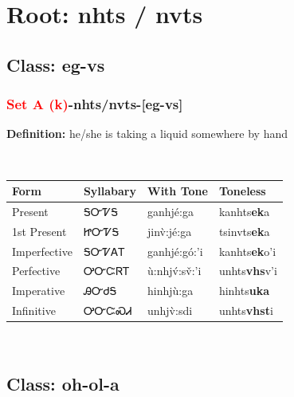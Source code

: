 \needspace{4in}
\section*{Root: nhts / nvts}
\nopagebreak
{}
\needspace{3in}
\subsection*{Class: eg-vs}
\nopagebreak
\needspace{2in}
\subsubsection*{\textcolor{Red}{Set A (k)}{-}\textbf{nhts/nvts}{-}[eg-vs]}
\nopagebreak
\textbf{Definition: } he/she is taking a liquid somewhere by hand
\\[0.5em]
\begin{tabularx}{\textwidth}{l X X X}%
\toprule%
\textbf{Form}&\textbf{Syllabary}&\textbf{With Tone}&\textbf{Toneless}\\%
\midrule%
Present&ᎦᏅᏤᎦ&ganhjé:ga&kanhts\textbf{ek}a\\%
1st Present&ᏥᏅᏤᎦ&jinv̀:jé:ga&tsinvts\textbf{ek}a\\%
Imperfective&ᎦᏅᏤᎪᎢ&ganhjé:gó:’i&kanhts\textbf{ek}o'i\\%
Perfective&ᎤᏅᏨᏒᎢ&ù:nhjv́:sv̌:’i&unhts\textbf{vhs}v'i\\%
Imperative&ᎯᏅᏧᎦ&hinhjù:ga&hinhts\textbf{uka}\\%
Infinitive&ᎤᏅᏨᏍᏗ&unhjv̀:sdi&unhts\textbf{vhst}i\\%
\bottomrule%
\end{tabularx}
\\[1em]
\needspace{3in}
\subsection*{Class: oh-ol-a}
\nopagebreak
\needspace{2in}
